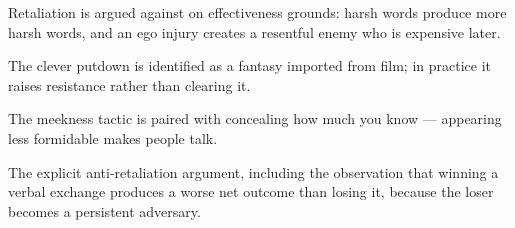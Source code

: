 

\begin{distilled}
  \item Retaliation is argued against on effectiveness grounds: harsh words produce more harsh words, and an ego injury creates a resentful enemy who is expensive later.
  \item The clever putdown is identified as a fantasy imported from film; in practice it raises resistance rather than clearing it.
  \item The meekness tactic is paired with concealing how much you know --- appearing less formidable makes people talk.
\end{distilled}

\begin{unique}
  \item The explicit anti-retaliation argument, including the observation that winning a verbal exchange produces a worse net outcome than losing it, because the loser becomes a persistent adversary.
\end{unique}
